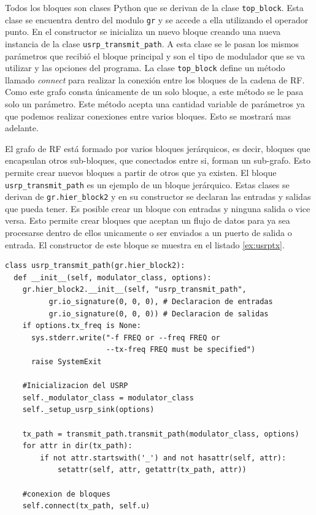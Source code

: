 Todos los bloques son clases Python que se derivan de la clase \verb|top_block|. Esta clase se
encuentra dentro del modulo \verb|gr| y se accede a ella utilizando el operador punto. En el
constructor se inicializa un nuevo bloque creando una nueva instancia de la clase
\verb|usrp_transmit_path|. A esta clase se le pasan los mismos par\'ametros que recibi\'o el bloque
principal y son el tipo de modulador que se va utilizar y las opciones del programa. La clase
\verb|top_block| define un m\'etodo llamado \emph{connect} para realizar la conexi\'on entre los
bloques de la cadena de RF. Como este grafo consta \'unicamente de un solo bloque, a este m\'etodo
se le pasa solo un par\'ametro. Este m\'etodo acepta una cantidad variable de par\'ametros ya que
podemos realizar conexiones entre varios bloques. Esto se mostrar\'a mas adelante.

El grafo de RF est\'a formado por varios bloques jer\'arquicos, es decir, bloques que encapsulan
otros sub-bloques, que conectados entre si, forman un sub-grafo. Esto permite crear nuevos bloques a
partir de otros que ya existen. El bloque \verb|usrp_transmit_path| es un ejemplo de un bloque
jer\'arquico. Estas clases se derivan de \verb|gr.hier_block2| y en su constructor se declaran las
entradas y salidas que pueda tener. Es posible crear un bloque con entradas y ninguna salida o vice
versa. Esto permite crear bloques que aceptan un flujo de datos para ya sea procesarse dentro de
ellos unicamente o ser enviados a un puerto de salida o entrada. El constructor de este bloque se
muestra en el listado \ref{ex:usrptx}.

\begin{lstlisting}[float, frame=single, label=ex:usrptx, caption={Constructor del bloque transmisor
del USRP.}] 
class usrp_transmit_path(gr.hier_block2):
  def __init__(self, modulator_class, options):
    gr.hier_block2.__init__(self, "usrp_transmit_path",
          gr.io_signature(0, 0, 0), # Declaracion de entradas
          gr.io_signature(0, 0, 0)) # Declaracion de salidas
    if options.tx_freq is None:
      sys.stderr.write("-f FREQ or --freq FREQ or 
                       --tx-freq FREQ must be specified")
      raise SystemExit

    #Inicializacion del USRP
    self._modulator_class = modulator_class
    self._setup_usrp_sink(options)

    tx_path = transmit_path.transmit_path(modulator_class, options)
    for attr in dir(tx_path): 
        if not attr.startswith('_') and not hasattr(self, attr):
            setattr(self, attr, getattr(tx_path, attr))

    #conexion de bloques
    self.connect(tx_path, self.u)
\end{lstlisting}


